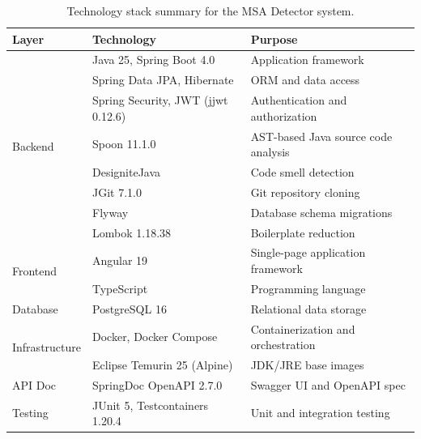 \begin{table}[htbp]
    \centering
    \footnotesize
    \begin{tabular}{|l|l|l|}
        \hline
        \textbf{Layer}                  & \textbf{Technology}                               & \textbf{Purpose}                      \\
        \hline\hline
        \multirow{8}{*}{Backend}        & Java 25, Spring Boot 4.0                          & Application framework                 \\
        \cline{2-3}
        & Spring Data JPA, Hibernate                        & ORM and data access                   \\
        \cline{2-3}
        & Spring Security, JWT (jjwt 0.12.6) \cite{RFC7519} & Authentication and authorization      \\
        \cline{2-3}
        & Spoon 11.1.0 \cite{Pawlak2016}                    & AST-based Java source code analysis   \\
        \cline{2-3}
        & DesigniteJava \cite{Sharma2018}                   & Code smell detection                  \\
        \cline{2-3}
        & JGit 7.1.0                                        & Git repository cloning                \\
        \cline{2-3}
        & Flyway                                            & Database schema migrations            \\
        \cline{2-3}
        & Lombok 1.18.38                   & Boilerplate reduction \\
        \hline
        \multirow{2}{*}{Frontend}       & Angular 19                                        & Single-page application framework     \\
        \cline{2-3}
        & TypeScript                                        & Programming language                  \\
        \hline
        Database                        & PostgreSQL 16                                     & Relational data storage               \\
        \hline
        \multirow{2}{*}{Infrastructure} & Docker, Docker Compose                            & Containerization and orchestration    \\
        \cline{2-3}
        & Eclipse Temurin 25 (Alpine)                       & JDK/JRE base images                   \\
        \hline
        API Doc               & SpringDoc OpenAPI 2.7.0                           & Swagger UI and OpenAPI spec           \\
        \hline
        Testing                         & JUnit 5, Testcontainers 1.20.4                    & Unit and integration testing          \\
        \hline
    \end{tabular}
    \caption{Technology stack summary for the MSA Detector system.
    }
    \label{tab:tech-stack}
\end{table}


